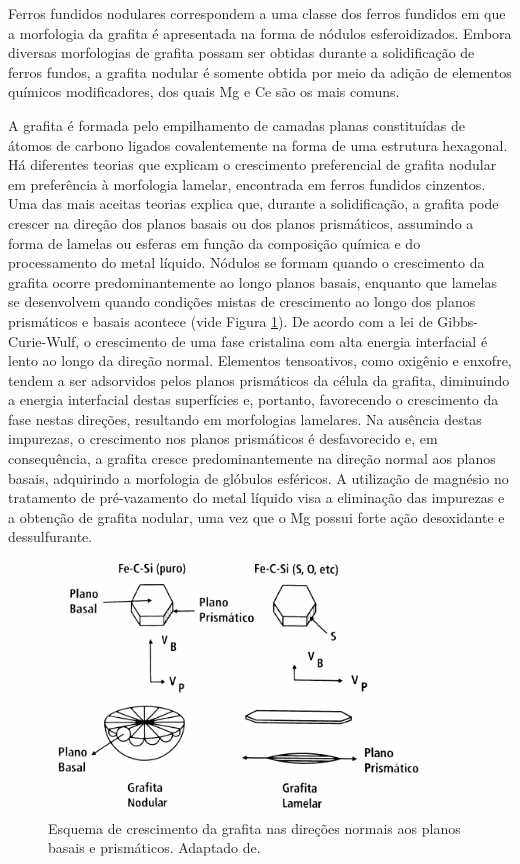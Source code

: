 Ferros fundidos nodulares correspondem a uma classe dos ferros fundidos em que a morfologia da grafita é apresentada na forma de nódulos esferoidizados. Embora diversas morfologias de grafita possam ser obtidas durante a solidificação de ferros fundos, a grafita nodular é somente obtida por meio da adição de elementos químicos modificadores, dos quais Mg e Ce são os mais comuns.

A grafita é formada pelo empilhamento de camadas planas constituídas de átomos de carbono ligados covalentemente na forma de uma estrutura hexagonal. Há diferentes teorias que explicam o crescimento preferencial de grafita nodular em preferência à morfologia lamelar, encontrada em ferros fundidos cinzentos. Uma das mais aceitas teorias explica que, durante a solidificação, a grafita pode crescer na direção dos planos basais ou dos planos prismáticos, assumindo a forma de lamelas ou esferas em função da composição química e do processamento do metal líquido. Nódulos se formam quando o crescimento da grafita ocorre predominantemente ao longo planos basais, enquanto que lamelas se desenvolvem quando condições mistas de crescimento ao longo dos planos prismáticos e basais acontece (vide Figura \ref{fig:grafita}). De acordo com a lei de Gibbs-Curie-Wulf, o crescimento de uma fase cristalina com alta energia interfacial é lento ao longo da direção normal\cite{Polackzek2008}. Elementos tensoativos, como oxigênio e enxofre, tendem a ser adsorvidos pelos planos prismáticos da célula da grafita, diminuindo a energia interfacial destas superfícies e, portanto, favorecendo o crescimento da fase nestas direções, resultando em morfologias lamelares\cite{Polackzek2008}. Na ausência destas impurezas, o crescimento nos planos prismáticos é desfavorecido e, em consequência, a grafita cresce predominantemente na direção normal aos planos basais, adquirindo a morfologia de glóbulos esféricos. A utilização de magnésio no tratamento de pré-vazamento do metal líquido visa a eliminação das impurezas e a obtenção de grafita nodular, uma vez que o Mg possui forte ação desoxidante e dessulfurante\cite{Labrecque1998}.

\begin{figure}
  \includegraphics[width=10cm]{img/grafita.pdf}
  \caption{Esquema de crescimento da grafita nas direções normais aos planos basais e prismáticos. Adaptado de\cite{McSwain1975}.}
  \label{fig:grafita}
\end{figure}

